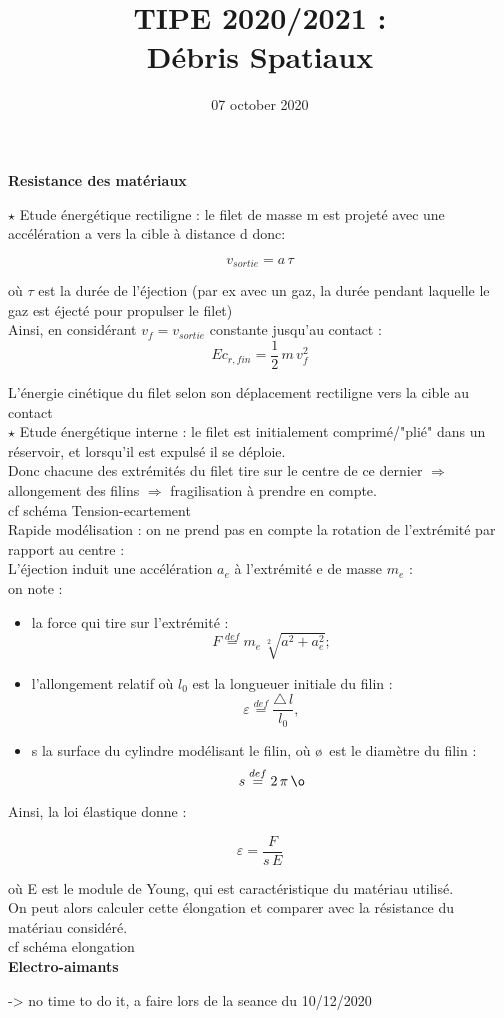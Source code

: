 \documentclass[a4paper,1pt]{article}
\title{TIPE 2020/2021 : \\ Débris Spatiaux}
\date{07 october 2020}
\begin{document}
\maketitle
\textbf{Resistance des matériaux}

$\star$ Etude énergétique rectiligne : le filet de masse m est projeté avec une accélération a vers la cible à 
distance d donc:

$$ v_{sortie} = a\,\tau $$

où $\tau$ est la durée de l'éjection (par ex avec un gaz, la durée pendant laquelle le gaz est éjecté pour propulser le filet)\\
Ainsi, en considérant $v_f = v_{sortie}$ constante jusqu'au contact :\\
$$ Ec_{r,fin} = \frac{1}{2}\,m\,v_f^2 $$

L'énergie cinétique du filet selon son déplacement rectiligne vers la cible au contact\\

$\star$ Etude énergétique interne : le filet est initialement comprimé/"plié" dans un réservoir, et lorsqu'il est expulsé il se déploie.\\
Donc chacune des extrémités du filet tire sur le centre de ce dernier $\Rightarrow$ allongement des filins $\Rightarrow$ fragilisation à prendre en compte.\\
cf schéma Tension-ecartement\\

Rapide modélisation : on ne prend pas en compte la rotation de l'extrémité par rapport au centre :\\
L'éjection induit une accélération $a_e$ à l'extrémité e de masse $m_e$ :\\
on note :
\begin{itemize}
    \item la force qui tire sur l'extrémité : $$F \stackrel{def}{=} m_e \, \sqrt[2]{a^2 + a_e^2};$$
    \item l'allongement relatif où $l_0$ est la longueuer initiale du filin : $$\varepsilon \stackrel{def}{=} \frac{\triangle\,l}{l_0}, $$ 
    \item s la surface du cylindre modélisant le filin, où \o\, est le diamètre du filin : $$s \stackrel{def}{=} 2\,\pi\,\o$$
\end{itemize}

Ainsi, la loi élastique donne :

$$\varepsilon = \frac{F}{s\,E}$$

où E est le module de Young, qui est caractéristique du matériau utilisé.\\

On peut alors calculer cette élongation et comparer avec la résistance du matériau considéré.\\
cf schéma elongation\\

\textbf{Electro-aimants}

-> no time to do it, a faire lors de la seance du 10/12/2020
\end{document}
